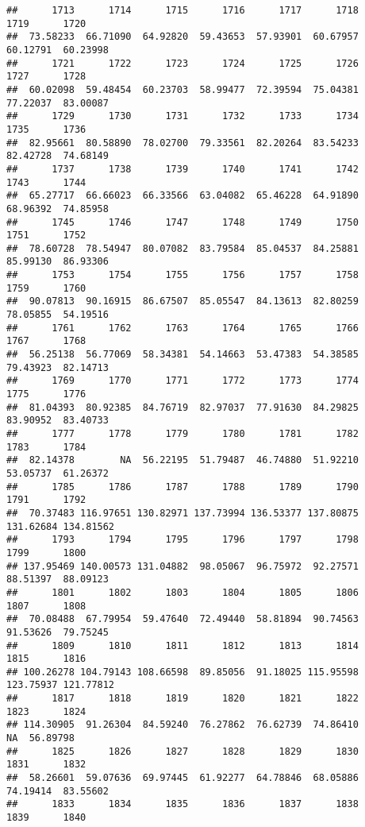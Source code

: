 \documentclass[
]{article}
\begin{document}
\begin{verbatim}
##      1713      1714      1715      1716      1717      1718      1719      1720 
##  73.58233  66.71090  64.92820  59.43653  57.93901  60.67957  60.12791  60.23998 
##      1721      1722      1723      1724      1725      1726      1727      1728 
##  60.02098  59.48454  60.23703  58.99477  72.39594  75.04381  77.22037  83.00087 
##      1729      1730      1731      1732      1733      1734      1735      1736 
##  82.95661  80.58890  78.02700  79.33561  82.20264  83.54233  82.42728  74.68149 
##      1737      1738      1739      1740      1741      1742      1743      1744 
##  65.27717  66.66023  66.33566  63.04082  65.46228  64.91890  68.96392  74.85958 
##      1745      1746      1747      1748      1749      1750      1751      1752 
##  78.60728  78.54947  80.07082  83.79584  85.04537  84.25881  85.99130  86.93306 
##      1753      1754      1755      1756      1757      1758      1759      1760 
##  90.07813  90.16915  86.67507  85.05547  84.13613  82.80259  78.05855  54.19516 
##      1761      1762      1763      1764      1765      1766      1767      1768 
##  56.25138  56.77069  58.34381  54.14663  53.47383  54.38585  79.43923  82.14713 
##      1769      1770      1771      1772      1773      1774      1775      1776 
##  81.04393  80.92385  84.76719  82.97037  77.91630  84.29825  83.90952  83.40733 
##      1777      1778      1779      1780      1781      1782      1783      1784 
##  82.14378        NA  56.22195  51.79487  46.74880  51.92210  53.05737  61.26372 
##      1785      1786      1787      1788      1789      1790      1791      1792 
##  70.37483 116.97651 130.82971 137.73994 136.53377 137.80875 131.62684 134.81562 
##      1793      1794      1795      1796      1797      1798      1799      1800 
## 137.95469 140.00573 131.04882  98.05067  96.75972  92.27571  88.51397  88.09123 
##      1801      1802      1803      1804      1805      1806      1807      1808 
##  70.08488  67.79954  59.47640  72.49440  58.81894  90.74563  91.53626  79.75245 
##      1809      1810      1811      1812      1813      1814      1815      1816 
## 100.26278 104.79143 108.66598  89.85056  91.18025 115.95598 123.75937 121.77812 
##      1817      1818      1819      1820      1821      1822      1823      1824 
## 114.30905  91.26304  84.59240  76.27862  76.62739  74.86410        NA  56.89798 
##      1825      1826      1827      1828      1829      1830      1831      1832 
##  58.26601  59.07636  69.97445  61.92277  64.78846  68.05886  74.19414  83.55602 
##      1833      1834      1835      1836      1837      1838      1839      1840 

\end{verbatim}
\end{document}
